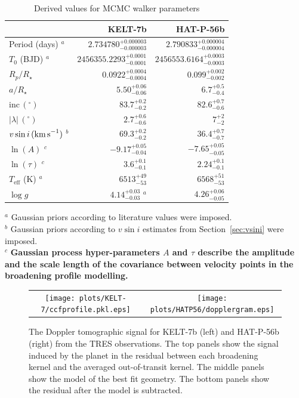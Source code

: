 \documentclass[useAMS,usenatbib]{mn2e}
\begin{document}
\begin{table}
  
  \caption{\label{tab:parameters}Derived values for MCMC walker parameters}
  \begin{tabular}{lrr}
    \hline\hline
    & \textbf{KELT-7b} & \textbf{HAT-P-56b}\\
    \hline
    Period (days) $^a$ & $2.734780_{-0.000003}^{+0.000003}$& $2.790833_{-0.000004}^{+0.000004}$ \\
    $T_0$ (BJD)  $^a$  & $2456355.2293_{-0.0001}^{+0.0001}$ & $2456553.6164_{-0.0003}^{+0.0003}$ \\
    $R_p/R_\star$  & $0.0922_{-0.0004}^{+0.0004}$ & $0.099_{-0.002}^{+0.002}$ \\
    $a/R_\star$  & $5.50_{-0.06}^{+0.06}$ &  $6.7_{-0.4}^{+0.5}$ \\
    $\text{inc}\,(^\circ)$  & $83.7_{-0.2}^{+0.2}$ & $82.6_{-0.6}^{+0.7}$\\
    $|\lambda|\,(^\circ)$  & $2.7_{-0.6}^{+0.6}$ & $7_{-2}^{+2}$\\
    $v\sin i\,(\text{km\,s}^{-1})$  $^b$  & $69.3_{-0.2}^{+0.2}$ & $36.4_{-0.7}^{+0.7}$\\
    $\ln(A)$ $^c$  & $-9.17_{-0.04}^{+0.05}$ & $-7.65_{-0.05}^{+0.05}$ \\
    $\ln(\tau)$ $^c$ & $3.6_{-0.1}^{+0.1}$ & $2.24_{-0.1}^{+0.1}$\\
    $T_\mathrm{eff}$ (K) $^a$  & $6513_{-53}^{+49}$& $6568_{-53}^{+51}$\\
    $\log g$  & $4.14_{-0.03}^{+0.03}$ $^a$ & $4.26_{-0.05}^{+0.06}$\\
    \hline
  \end{tabular}
  \begin{flushleft}
  $^a$ Gaussian priors according to literature values were imposed.\\
  $^b$ Gaussian priors according to $v\sin i$ estimates from Section~\ref{sec:vsini} were imposed.  \\
  $^c$ \textbf{Gaussian process hyper-parameters $A$ and $\tau$ describe the amplitude and the scale length of the covariance between velocity points in the broadening profile modelling.}
  \end{flushleft}
\end{table}

\begin{figure}
  \begin{tabular}{cc}
    \texttt{[image: plots/KELT-7/ccfprofile.pkl.eps]} &
    \texttt{[image: plots/HATP56/dopplergram.eps]} \\
  \end{tabular}
  
  \caption{\label{fig:dopplergram}The Doppler tomographic signal for KELT-7b (left) and HAT-P-56b (right) from the TRES observations. The top panels show the signal induced by the planet in the residual between each broadening kernel and the averaged out-of-transit kernel. The middle panels show the model of the best fit geometry. The bottom panels show the residual after the model is subtracted. }
\end{figure}
\end{document}
